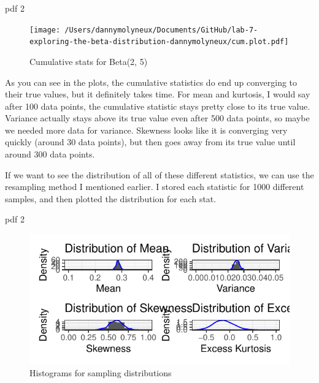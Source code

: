 \documentclass{article}\usepackage[]{graphicx}\usepackage[]{xcolor}
\makeatletter
\newenvironment{kframe}{%
 \def\at@end@of@kframe{}%
 \ifinner\ifhmode%
  \def\at@end@of@kframe{\end{minipage}}%
  \begin{minipage}{\columnwidth}%
 \fi\fi%
 \def\FrameCommand##1{\hskip\@totalleftmargin \hskip-\fboxsep
 \colorbox{shadecolor}{##1}\hskip-\fboxsep
     \hskip-\linewidth \hskip-\@totalleftmargin \hskip\columnwidth}%
 \MakeFramed {\advance\hsize-\width
   \@totalleftmargin\z@ \linewidth\hsize
   \@setminipage}}%
 {\par\unskip\endMakeFramed%
 \at@end@of@kframe}
\makeatother
\begin{document}
\begin{multicols}{2}
\begin{kframe}


{\ttfamily\noindent\bfseries\color{errorcolor}{\#\# Error: object 'beta.data' not found}}

{\ttfamily\noindent\bfseries\color{errorcolor}{\#\# Error: object 'data\_2\_5' not found}}

{\ttfamily\noindent\bfseries\color{errorcolor}{\#\# Error: object 'data\_2\_5' not found}}

{\ttfamily\noindent\bfseries\color{errorcolor}{\#\# Error: object 'data\_2\_5' not found}}

{\ttfamily\noindent\bfseries\color{errorcolor}{\#\# Error: object 'data\_2\_5' not found}}

{\ttfamily\noindent\bfseries\color{errorcolor}{\#\# Error: object 'mean.plot' not found}}\end{kframe}pdf 
  2 

\begin{figure} [H]
\centering
\texttt{[image: /Users/dannymolyneux/Documents/GitHub/lab-7-exploring-the-beta-distribution-dannymolyneux/cum.plot.pdf]}
\caption{Cumulative stats for Beta(2, 5)}
\label{fig:cumstats}
\end{figure}

As you can see in the plots, the cumulative statistics do end up converging to their true values, but it definitely takes time. For mean and kurtosis, I would say after 100 data points, the cumulative statistic stays pretty close to its true value. Variance actually stays above its true value even after 500 data points, so maybe we needed more data for variance. Skewness looks like it is converging very quickly (around 30 data points), but then goes away from its true value until around 300 data points. 

If we want to see the distribution of all of these different statistics, we can use the resampling method I mentioned earlier. I stored each statistic for 1000 different samples, and then plotted the distribution for each stat.

pdf 
  2 

\begin{figure} [H]
\centering
\includegraphics[width=\linewidth]{resampling.pdf}
\caption{Histograms for sampling distributions}
\label{fig:sampling}
\end{figure}


\end{multicols}
\end{document}
